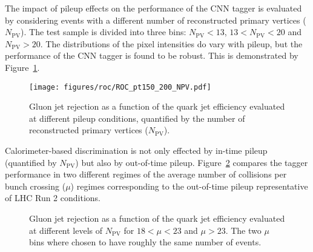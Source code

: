 The impact of pileup effects on the performance of the CNN tagger is evaluated 
by considering events with a different number of reconstructed primary vertices ($N_\text{PV}$).
The test sample is divided into three bins: $N_\text{PV}<13$, $13<N_\text{PV}<20$ and $N_\text{PV}>20$.  
The distributions of the pixel intensities do vary with pileup, 
but the performance of the CNN tagger is found to be robust. 
This is demonstrated by Figure~\ref{fig:pileup}. 

\begin{figure}[tbp]
\begin{center}
\texttt{[image: figures/roc/ROC\_pt150\_200\_NPV.pdf]}
\caption{Gluon jet rejection as a function of the quark jet efficiency %
evaluated at different pileup conditions, 
quantified by the number of reconstructed primary vertices ($N_\text{PV}$).}
\label{fig:pileup}
\end{center}
\end{figure}

Calorimeter-based discrimination is not only effected by in-time pileup (quantified by $N_\text{PV}$) but also by out-of-time pileup. 
Figure~\ref{fig:pileup2} compares the tagger performance in two different regimes of the average number of collisions per bunch crossing ($\mu$) regimes corresponding to the out-of-time pileup representative of LHC Run 2 conditions.

\begin{figure}[tbp]
\begin{center}
\caption{Gluon jet rejection as a function of the quark jet efficiency 
evaluated at different levels of $N_\text{PV}$ for \protect{} $18<\mu<23$ and \protect{}  $\mu > 23$.
The two $\mu$ bins where chosen to have roughly the same number of events.}
\label{fig:pileup2}
\end{center}
\end{figure}
